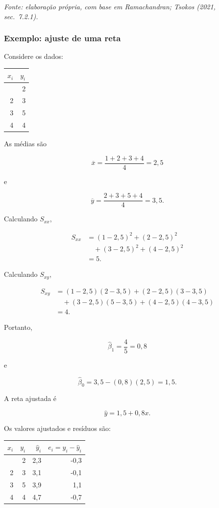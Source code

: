 \documentclass[
  letterpaper,
  DIV=11,
  numbers=noendperiod]{scrreprt}
\begin{document}
\emph{Fonte: elaboração própria, com base em Ramachandran; Tsokos (2021,
sec.~7.2.1).}

\subsubsection{Exemplo: ajuste de uma
reta}\label{exemplo-ajuste-de-uma-reta}

Considere os dados:

\begin{longtable}[]{@{}rr@{}}
\toprule\noalign{}
\(x_i\) & \(y_i\) \\
\midrule\noalign{}
\endhead
\bottomrule\noalign{}
\endlastfoot
1 & 2 \\
2 & 3 \\
3 & 5 \\
4 & 4 \\
\end{longtable}

As médias são

\[\overline x
=
\frac{1+2+3+4}{4}
=
2{,}5\]

e

\[\overline y
=
\frac{2+3+5+4}{4}
=
3{,}5.\]

Calculando \(S_{xx}\),

\[\begin{aligned}
S_{xx}
&=
(1-2{,}5)^2
+
(2-2{,}5)^2\\
&\quad+
(3-2{,}5)^2
+
(4-2{,}5)^2\\
&=
5.
\end{aligned}\]

Calculando \(S_{xy}\),

\[\begin{aligned}
S_{xy}
&=
(1-2{,}5)(2-3{,}5)
+
(2-2{,}5)(3-3{,}5)\\
&\quad+
(3-2{,}5)(5-3{,}5)
+
(4-2{,}5)(4-3{,}5)\\
&=
4.
\end{aligned}\]

Portanto,

\[\widehat\beta_1
=
\frac{4}{5}
=
0{,}8\]

e

\[\widehat\beta_0
=
3{,}5-(0{,}8)(2{,}5)
=
1{,}5.\]

A reta ajustada é

\[\boxed{
\widehat y
=
1{,}5+0{,}8x
}.\]

Os valores ajustados e resíduos são:

\begin{longtable}[]{@{}rrrr@{}}
\toprule\noalign{}
\(x_i\) & \(y_i\) & \(\widehat y_i\) & \(e_i=y_i-\widehat y_i\) \\
\midrule\noalign{}
\endhead
\bottomrule\noalign{}
\endlastfoot
1 & 2 & 2,3 & -0,3 \\
2 & 3 & 3,1 & -0,1 \\
3 & 5 & 3,9 & 1,1 \\
4 & 4 & 4,7 & -0,7 \\
\end{longtable}
\end{document}
